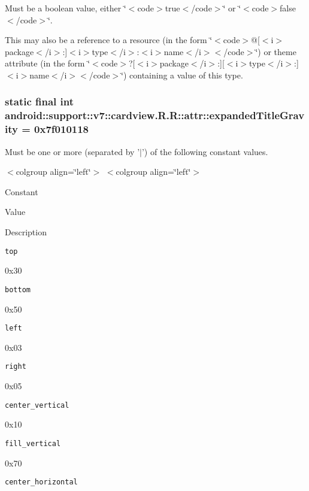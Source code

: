 Must be a boolean value, either \char`\"{}$<$code$>$true$<$/code$>$\char`\"{} or \char`\"{}$<$code$>$false$<$/code$>$\char`\"{}. 

This may also be a reference to a resource (in the form \char`\"{}$<$code$>$@\mbox{[}$<$i$>$package$<$/i$>$:\mbox{]}$<$i$>$type$<$/i$>$:$<$i$>$name$<$/i$>$$<$/code$>$\char`\"{}) or theme attribute (in the form \char`\"{}$<$code$>$?\mbox{[}$<$i$>$package$<$/i$>$:\mbox{]}\mbox{[}$<$i$>$type$<$/i$>$:\mbox{]}$<$i$>$name$<$/i$>$$<$/code$>$\char`\"{}) containing a value of this type. \hypertarget{classandroid_1_1support_1_1v7_1_1cardview_1_1_r_1_1attr_92fa0bf84ea82b0adaf4aa3ad62631e0}{
\subsubsection[{expandedTitleGravity}]{\setlength{\rightskip}{0pt plus 5cm}static final int android::support::v7::cardview.R.R::attr::expandedTitleGravity = 0x7f010118}}
\label{classandroid_1_1support_1_1v7_1_1cardview_1_1_r_1_1attr_92fa0bf84ea82b0adaf4aa3ad62631e0}


Must be one or more (separated by '$|$') of the following constant values. \begin{TabularC}{0}
\hline
\end{TabularC}
$<$colgroup align=\char`\"{}left\char`\"{}$>$ $<$colgroup align=\char`\"{}left\char`\"{}$>$ 

Constant

Value

Description 

{\tt top}

0x30

{\tt bottom}

0x50

{\tt left}

0x03

{\tt right}

0x05

{\tt center\_\-vertical}

0x10

{\tt fill\_\-vertical}

0x70

{\tt center\_\-horizontal}

